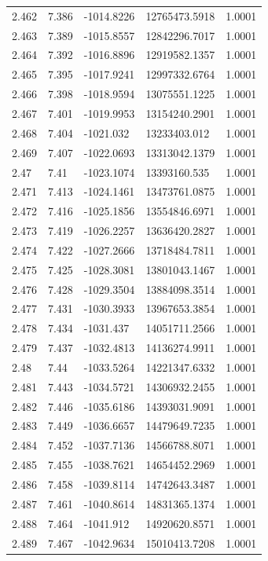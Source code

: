 \begin{tabular}{lllll}
2.462 & 7.386 & -1014.8226 & 12765473.5918 & 1.0001 \\
2.463 & 7.389 & -1015.8557 & 12842296.7017 & 1.0001 \\
2.464 & 7.392 & -1016.8896 & 12919582.1357 & 1.0001 \\
2.465 & 7.395 & -1017.9241 & 12997332.6764 & 1.0001 \\
2.466 & 7.398 & -1018.9594 & 13075551.1225 & 1.0001 \\
2.467 & 7.401 & -1019.9953 & 13154240.2901 & 1.0001 \\
2.468 & 7.404 & -1021.032 & 13233403.012 & 1.0001 \\
2.469 & 7.407 & -1022.0693 & 13313042.1379 & 1.0001 \\
2.47 & 7.41 & -1023.1074 & 13393160.535 & 1.0001 \\
2.471 & 7.413 & -1024.1461 & 13473761.0875 & 1.0001 \\
2.472 & 7.416 & -1025.1856 & 13554846.6971 & 1.0001 \\
2.473 & 7.419 & -1026.2257 & 13636420.2827 & 1.0001 \\
2.474 & 7.422 & -1027.2666 & 13718484.7811 & 1.0001 \\
2.475 & 7.425 & -1028.3081 & 13801043.1467 & 1.0001 \\
2.476 & 7.428 & -1029.3504 & 13884098.3514 & 1.0001 \\
2.477 & 7.431 & -1030.3933 & 13967653.3854 & 1.0001 \\
2.478 & 7.434 & -1031.437 & 14051711.2566 & 1.0001 \\
2.479 & 7.437 & -1032.4813 & 14136274.9911 & 1.0001 \\
2.48 & 7.44 & -1033.5264 & 14221347.6332 & 1.0001 \\
2.481 & 7.443 & -1034.5721 & 14306932.2455 & 1.0001 \\
2.482 & 7.446 & -1035.6186 & 14393031.9091 & 1.0001 \\
2.483 & 7.449 & -1036.6657 & 14479649.7235 & 1.0001 \\
2.484 & 7.452 & -1037.7136 & 14566788.8071 & 1.0001 \\
2.485 & 7.455 & -1038.7621 & 14654452.2969 & 1.0001 \\
2.486 & 7.458 & -1039.8114 & 14742643.3487 & 1.0001 \\
2.487 & 7.461 & -1040.8614 & 14831365.1374 & 1.0001 \\
2.488 & 7.464 & -1041.912 & 14920620.8571 & 1.0001 \\
2.489 & 7.467 & -1042.9634 & 15010413.7208 & 1.0001 \\

\end{tabular}
